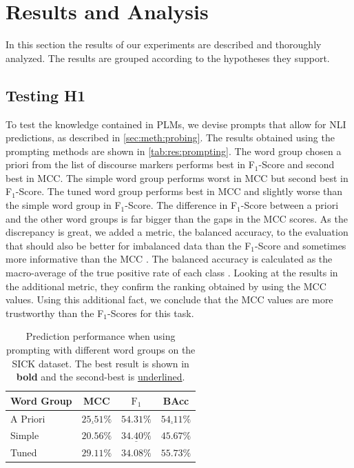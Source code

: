 \section{Results and Analysis} \label{sec:results}
In this section the results of our experiments are described and thoroughly analyzed. The results are grouped according to the hypotheses they support.

\subsection{Testing H1}
To test the knowledge contained in \acp{PLM}, we devise prompts that allow for \ac{NLI} predictions, as described in \autoref{sec:meth:probing}. The results obtained using the prompting methods are shown in \autoref{tab:res:prompting}. The word group chosen a priori from the list of discourse markers performs best in F$_1$-Score and second best in \ac{MCC}. The simple word group performs worst in \ac{MCC} but second best in F$_1$-Score. The tuned word group performs best in \ac{MCC} and slightly worse than the simple word group in F$_1$-Score. The difference in F$_1$-Score between a priori and the other word groups is far bigger than the gaps in the \ac{MCC} scores. As the discrepancy is great, we added a metric, the balanced accuracy, to the evaluation that should also be better for imbalanced data than the F$_1$-Score and sometimes more informative than the \ac{MCC} \cite{mccBad}. The balanced accuracy is calculated as the macro-average of the true positive rate of each class \cite{bacc}. Looking at the results in the additional metric, they confirm the ranking obtained by using the \ac{MCC} values. Using this additional fact, we conclude that the \ac{MCC} values are more trustworthy than the F$_1$-Scores for this task.
\begin{table}[ht!]
    \centering
    \caption{Prediction performance when using prompting with different word groups on the \acs{SICK} dataset. The best result is shown in \textbf{bold} and the second-best is \underline{underlined}.}
    \begin{tabular}{l c c c}
        \toprule
        \multicolumn{1}{c}{Word Group} & \acs{MCC} & $\text{F}_1$ & BAcc\\
        \midrule
        A Priori & $\underline{25.51}\%$ & $\mathbf{54.31\%}$ & $\underline{54.11}\%$ \\
        Simple & $20.56\%$ & $\underline{34.40\%}$ & $45.67\%$ \\
        Tuned & $\mathbf{29.11\%}$ & $34.08\%$ & $\mathbf{55.73\%}$\\
        \bottomrule
    \end{tabular}
    \label{tab:res:prompting}
\end{table}

